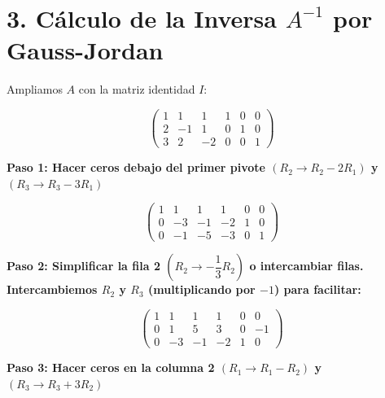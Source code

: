 \documentclass{article}
\begin{document}
	\newpage
	
	
	\section*{3. Cálculo de la Inversa $A^{-1}$ por Gauss-Jordan}
	
	Ampliamos $A$ con la matriz identidad $I$:
	
	\bigskip
	
	\[
	\left(
	\begin{array}{ccc|ccc}
		1 &  1 &  1 & 1 & 0 & 0 \\
		2 & -1 &  1 & 0 & 1 & 0 \\
		3 &  2 & -2 & 0 & 0 & 1
	\end{array}
	\right)
	\]
	
	\bigskip
	
	\noindent \textbf{Paso 1: Hacer ceros debajo del primer pivote
		$(R_2 \rightarrow R_2 - 2R_1)$ y $(R_3 \rightarrow R_3 - 3R_1)$}
	
	\bigskip
	
	\[
	\left(
	\begin{array}{ccc|ccc}
		1 &  1 &  1 &  1 & 0 & 0 \\
		0 & -3 & -1 & -2 & 1 & 0 \\
		0 & -1 & -5 & -3 & 0 & 1
	\end{array}
	\right)
	\]
	
	\newpage
	
	
	\noindent \textbf{Paso 2: Simplificar la fila 2
		$\left(R_2 \rightarrow -\dfrac{1}{3}R_2\right)$ o intercambiar filas.
		Intercambiemos $R_2$ y $R_3$ (multiplicando por $-1$) para facilitar:}
	
	\bigskip
	
	\[
	\left(
	\begin{array}{ccc|ccc}
		1 &  1 &  1 &  1 & 0 &  0 \\
		0 &  1 &  5 &  3 & 0 & -1 \\
		0 & -3 & -1 & -2 & 1 &  0
	\end{array}
	\right)
	\]
	
	\bigskip
	
	\noindent \textbf{Paso 3: Hacer ceros en la columna 2
		$(R_1 \rightarrow R_1 - R_2)$ y $(R_3 \rightarrow R_3 + 3R_2)$}
	
\end{document}
